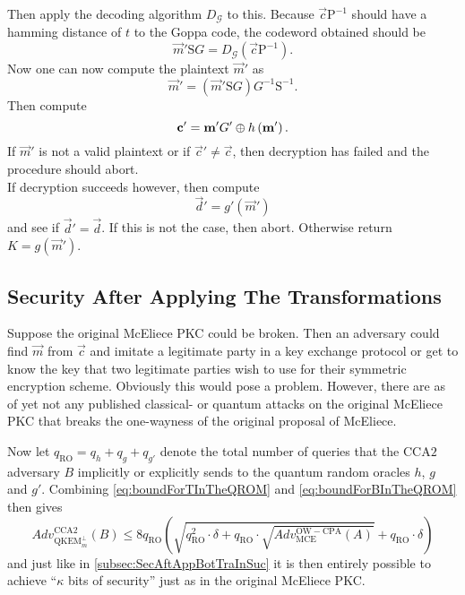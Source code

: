 \begin{description}
\[		\]
		Then apply the decoding algorithm $D_{\mathcal{G}}$ to this. Because $\vec{c}\mathrm{P}^{-1}$ should have a hamming distance of $t$ to the Goppa code, the codeword obtained should be
		\[
			\vec{m}'\mathrm{S}G = D_{\mathcal{G}} \left( \vec{c}\mathrm{P}^{-1} \right).
		\]
		Now one can now compute the plaintext $\vec{m}'$ as
		\[
			\vec{m}' = \left( \vec{m}'\mathrm{S}G \right)  G^{-1} \mathrm{S}^{-1}.
		\]
		Then compute
		\[
			\boldsymbol{\mathrm{c}}' = \boldsymbol{\mathrm{m}}' G' \mathbin{\oplus} h\left(\boldsymbol{\mathrm{m}}'\right).
		\]
		If $\vec{m}'$ is not a valid plaintext or if $\vec{c}' \neq \vec{c}$, then decryption has failed and the procedure should abort.\\
		If decryption succeeds however, then compute
		\[
			\vec{d}' = g'\left( \vec{m}' \right)
		\]
		and see if $\vec{d}' = \vec{d}$. If this is not the case, then abort. Otherwise return $K = g\left( \vec{m}' \right)$.
\end{description}



\subsection{Security After Applying The Transformations}

Suppose the original McEliece PKC could be broken. Then an adversary could find $\vec{m}$ from $\vec{c}$ and imitate a legitimate party in a key exchange protocol or get to know the key that two legitimate parties wish to use for their symmetric encryption scheme. Obviously this would pose a problem. However, there are as of yet not any published classical- or quantum attacks on the original McEliece PKC that breaks the one-wayness of the original proposal of McEliece.

Now let $q_{\mathrm{RO}} = q_h + q_g + q_{g'}$ denote the total number of queries that the $\mathrm{CCA}2$ adversary $B$ implicitly or explicitly sends to the quantum random oracles $h$, $g$ and $g'$. Combining \cref{eq:boundForTInTheQROM} and \cref{eq:boundForBInTheQROM} then gives
\[
	Adv_{\mathrm{QKEM}^{\bot}_m}^{\mathrm{CCA}2}\left(B\right) \leq 8 q_{\mathrm{RO}} \left( \sqrt{q_{\mathrm{RO}}^2 \cdot \delta + q_{\mathrm{RO}} \cdot \sqrt{Adv_{\mathrm{MCE}}^{\mathrm{OW-CPA}} \left(A\right)}} + q_{\mathrm{RO}} \cdot \delta \right)
\]
and just like in \cref{subsec:SecAftAppBotTraInSuc} it is then entirely possible to achieve ``$\kappa$ bits of security'' just as in the original McEliece PKC.

